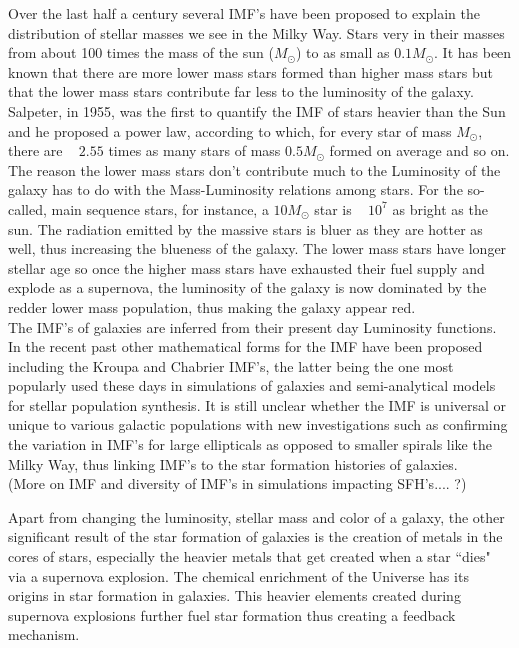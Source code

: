 Over the last half a century several IMF's have been proposed to explain the distribution of stellar masses we see in the Milky Way. Stars very in their masses from about 100 times the mass of the sun ($M_{\odot}$) to as small as $0.1M_{\odot}$. It has been known that there are more lower mass stars formed than higher mass stars but that the lower mass stars contribute far less to the luminosity of the galaxy. Salpeter, in 1955, was the first to quantify the IMF \citep{1955ApJ...121..161S} of stars heavier than the Sun and he proposed a power law, according to which, for every star of mass $M_{\odot}$, there are ~ $2.55$ times as many stars of mass $0.5M_{\odot}$  formed on average and so on. The reason the lower mass stars don't contribute much to the Luminosity of the galaxy has to do with the Mass-Luminosity relations among stars. For the so-called, main sequence stars, for instance, a $10M_{\odot}$ star is ~ $10^{7}$ as bright as the sun. The radiation emitted by the massive stars is bluer as they are hotter as well, thus increasing the blueness of the galaxy. The lower mass stars have longer stellar age so once the higher mass stars have exhausted their fuel supply and explode as a supernova, the luminosity of the galaxy is now dominated by the redder lower mass population, thus making the galaxy appear red.\\

The IMF's of galaxies are inferred from their present day Luminosity functions. In the recent past other mathematical forms for the IMF have been proposed including the Kroupa \citep{2001MNRAS.322..231K} and Chabrier \citep{2003PASP..115..763C} IMF's, the latter being the one most popularly used these days in simulations of galaxies and semi-analytical models for stellar population synthesis. It is still unclear whether the IMF is universal or unique to various galactic populations with  new investigations such as\citet{2012Natur.484..485C} confirming the variation in IMF's for large ellipticals as opposed to smaller spirals like the Milky Way, thus linking IMF's to the star formation histories of galaxies.\\

(More on IMF and diversity of IMF's in simulations impacting SFH's.... ?)

Apart from changing the luminosity, stellar mass and color of a galaxy, the other significant result of the star formation of galaxies is the creation of metals in the cores of stars, especially the heavier metals that get created when a star ``dies" via a supernova explosion. The chemical enrichment of the Universe has its origins in star formation in galaxies. This heavier elements created during supernova explosions further fuel star formation thus creating a feedback mechanism.\\ 


